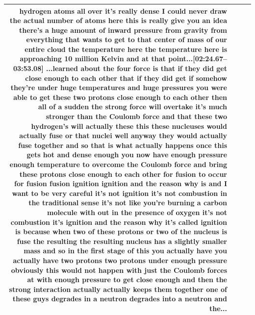 \documentclass[10pt]{article}
\begin{document}
\begin{tiny}
\begin{longtable}{|r|p{0.375in}|p{1.275in}|p{3.5in}|}
hydrogen atoms all over it's really dense I could never draw the actual number of atoms here this is really give you an idea there's a huge amount of inward pressure from gravity from everything that wants to get to that center of mass of our entire cloud the temperature here the temperature here is approaching 10 million Kelvin and at that point...\newline\textbf{[02:24.67--03:53.08]} ...learned about the four force is that if they did get close enough to each other that if they did get if somehow they're under huge temperatures and huge pressures you were able to get these two protons close enough to each other then all of a sudden the strong force will overtake it's much stronger than the Coulomb force and that these two hydrogen's will actually these this these nucleuses would actually fuse or that nuclei well anyway they would actually fuse together and so that is what actually happens once this gets hot and dense enough you now have enough pressure enough temperature to overcome the Coulomb force and bring these protons close enough to each other for fusion to occur for fusion fusion ignition ignition and the reason why is and I want to be very careful it's not ignition it's not combustion in the traditional sense it's not like you're burning a carbon molecule with out in the presence of oxygen it's not combustion it's ignition and the reason why it's called ignition is because when two of these protons or two of the nucleus is fuse the resulting the resulting nucleus has a slightly smaller mass and so in the first stage of this you actually have you actually have two protons two protons under enough pressure obviously this would not happen with just the Coulomb forces at with enough pressure to get close enough and then the strong interaction actually actually keeps them together one of these guys degrades in a neutron degrades into a neutron and the... \\\hline

\end{longtable}
\end{tiny}
\end{document}
